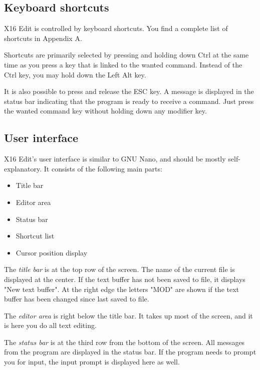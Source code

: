 \documentclass{article}
\begin{document}
    \subsection{Keyboard shortcuts}
        X16 Edit is controlled by keyboard shortcuts. You find a complete list
        of shortcuts in Appendix A.

        Shortcuts are primarily selected by pressing and holding down Ctrl at the
        same time as you press a key that is linked to the wanted command. Instead of
        the Ctrl key, you may hold down the Left Alt key.

        It is also possible to press and release the ESC key. A message is displayed
        in the status bar indicating that the program is ready to receive a command.
        Just press the wanted command key without holding down any modifier key.
      
    \subsection{User interface}
        X16 Edit's user interface is similar to GNU Nano, and should be mostly self-explanatory.
        It consists of the following main parts:

        \begin{itemize}
            \item Title bar
            \item Editor area
            \item Status bar
            \item Shortcut list
            \item Cursor position display
        \end{itemize}

        The \textit{title bar} is at the top row of the screen. The name of the current file
        is displayed at the center. If the text buffer has not been saved to file, it displays
        "New text buffer". At the right edge the letters "MOD" are shown if the
        text buffer has been changed since last saved to file.

        The \textit{editor area} is right below the title bar. It takes up most of the screen, and
        it is here you do all text editing.

        The \textit{status bar} is at the third row from the bottom of the screen. All messages
        from the program are displayed in the status bar. If the program needs to prompt you
        for input, the input prompt is displayed here as well. 
        
\end{document}
